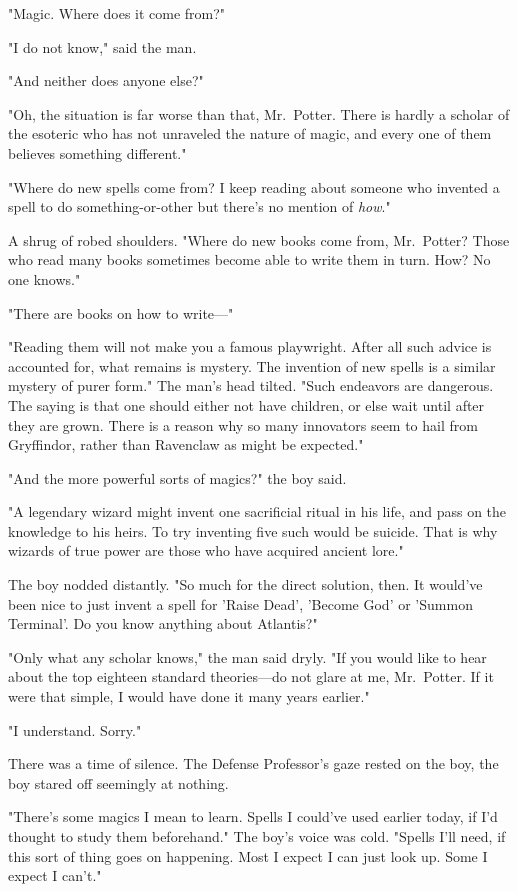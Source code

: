 "Magic. Where does it come from?"

"I do not know," said the man.

"And neither does anyone else?"

"Oh, the situation is far worse than that, Mr.~Potter. There is hardly a 
scholar of the esoteric who has not unraveled the nature of magic, and every 
one of them believes something different."

"Where do new spells come from? I keep reading about someone who invented a 
spell to do something-or-other but there's no mention of \emph{how}."

A shrug of robed shoulders. "Where do new books come from, Mr.~Potter? Those 
who read many books sometimes become able to write them in turn. How? No one 
knows."

"There are books on how to write---"

"Reading them will not make you a famous playwright. After all such advice is 
accounted for, what remains is mystery. The invention of new spells is a 
similar mystery of purer form." The man's head tilted. "Such endeavors are 
dangerous. The saying is that one should either not have children, or else wait 
until after they are grown. There is a reason why so many innovators seem to 
hail from Gryffindor, rather than Ravenclaw as might be expected."

"And the more powerful sorts of magics?" the boy said.

"A legendary wizard might invent one sacrificial ritual in his life, and pass 
on the knowledge to his heirs. To try inventing five such would be suicide. 
That is why wizards of true power are those who have acquired ancient lore."

The boy nodded distantly. "So much for the direct solution, then. It would've 
been nice to just invent a spell for 'Raise Dead', 'Become God' or 'Summon 
Terminal'. Do you know anything about Atlantis?"

"Only what any scholar knows," the man said dryly. "If you would like to hear 
about the top eighteen standard theories---do not glare at me, Mr.~Potter. If 
it were that simple, I would have done it many years earlier."

"I understand. Sorry."

There was a time of silence. The Defense Professor's gaze rested on the boy, 
the boy stared off seemingly at nothing.

"There's some magics I mean to learn. Spells I could've used earlier today, if 
I'd thought to study them beforehand." The boy's voice was cold. "Spells I'll 
need, if this sort of thing goes on happening. Most I expect I can just look 
up. Some I expect I can't."

